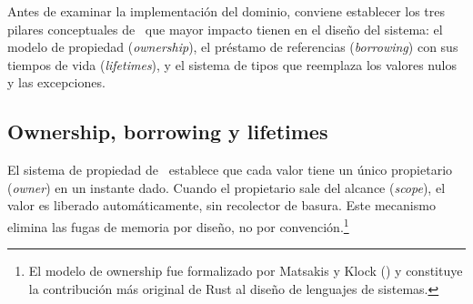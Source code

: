\noindent
Antes de examinar la implementación del dominio, conviene establecer los tres pilares
conceptuales de \rust\ que mayor impacto tienen en el diseño del sistema: el modelo
de propiedad (\textit{ownership}), el préstamo de referencias (\textit{borrowing})
con sus tiempos de vida (\textit{lifetimes}), y el sistema de tipos que reemplaza
los valores nulos y las excepciones.

\subsection{Ownership, borrowing y lifetimes}
\label{subsec:ownership}

El sistema de propiedad de \rust\ establece que cada valor tiene un único propietario
(\textit{owner}) en un instante dado. Cuando el propietario sale del alcance
(\textit{scope}), el valor es liberado automáticamente, sin recolector de basura.
Este mecanismo elimina las fugas de memoria por diseño, no por convención.\footnote{El
modelo de ownership fue formalizado por Matsakis y Klock (\cite{matsakis2014}) y
constituye la contribución más original de Rust al diseño de lenguajes de sistemas.}

